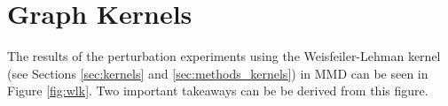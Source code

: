 





\section{Graph Kernels}\label{sec:results_graph_kernels}

The results of the perturbation experiments using the Weisfeiler-Lehman kernel
(see Sections \ref{sec:kernels} and \ref{sec:methods_kernels}) in MMD can be
seen in Figure \ref{fig:wlk}. Two important takeaways can be be derived from
this figure.

